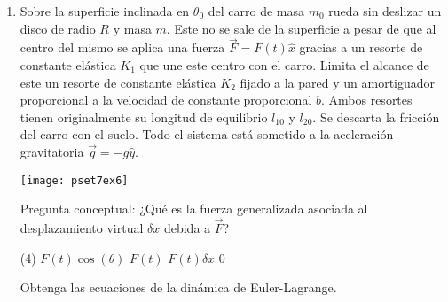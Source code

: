 \documentclass[11pt, spanish, a4paper, twoside]{article}
\begin{document}
\begin{enumerate}
\item
\begin{minipage}[t][6cm]{0.5\textwidth}
Sobre la superficie inclinada en $\theta_0$ del carro de masa $m_0$ rueda sin deslizar un disco de radio $R$ y masa $m$.
Este no se sale de la superficie a pesar de que al centro del mismo se aplica una fuerza $\vec{F}= F(t) \hat{x}$ gracias a un resorte de constante elástica $K_1$ que une este centro con el carro.
Limita el alcance de este un resorte de constante elástica $K_2$ fijado a la pared y un amortiguador proporcional a la velocidad de constante proporcional $b$.
Ambos resortes tienen originalmente su longitud de equilibrio $l_{10}$ y $l_{20}$.
Se descarta la fricción del carro con el suelo.
Todo el sistema está sometido a la aceleración gravitatoria $\vec{g}= - g \hat{y}$.\\
\end{minipage}
\begin{minipage}[c][0cm][t]{0.45\textwidth}
	\texttt{[image: pset7ex6]}
\end{minipage}
Pregunta conceptual: ¿Qué es la fuerza generalizada asociada al desplazamiento virtual $\delta x$ debida a $\vec{F}$?\\
\begin{tasks}(4)
	\task $F(t) \cos(\theta)$
	\task $F(t)$
	\task $F(t) \delta x$
	\task $0$
\end{tasks}
Obtenga las ecuaciones de la dinámica de Euler-Lagrange. 



\end{enumerate}
\end{document}
